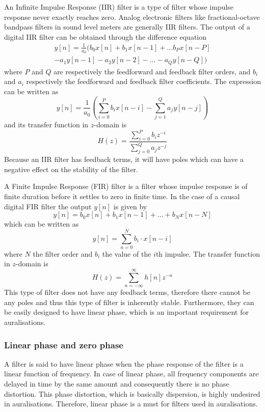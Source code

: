 An Infinite Impulse Response (IIR) filter is a type of filter whose impulse response never exactly reaches zero. Analog electronic filters like fractional-octave bandpass filters in sound level meters are generally IIR filters.
The output of a digital IIR filter can be obtained through the difference equation
\begin{multline}
 y[n] = \frac{1}{a_0} ( b_0 x[n] + b_1 x[n-1] + \dots b_P x[n-P] \\
      - a_1 y[n-1] - a_2 y[n-2] - \dots - a_Q y[n-Q] )
\end{multline}
where $P$ and $Q$ are respectively the feedforward and feedback filter orders, and $b_i$ and $a_i$ respectively the feedforward and feedback filter coefficients.
The expression can be written as
\begin{equation}
 y[n] = \frac{1}{a_0} \left( \sum_{i=0}^{P} b_i x[n-i] - \sum_{j=1}^Q a_j y[n-j] \right)
\end{equation}
and its transfer function in $z$-domain is
\begin{equation}
 H(z) = \frac{\sum_{i=0}^P b_i z^{-i}}{\sum_{j=0}^Q a_j z^{-j}}
\end{equation}
Because an IIR filter has feedback terms, it will have poles which can have a negative effect on the stability of the filter.

A Finite Impulse Response (FIR) filter is a filter whose impulse response is of finite duration before it settles to zero in finite time.
In the case of a causal digital FIR filter the output $y[n]$ is given by
\begin{equation}
 y[n] = b_0 x[n] + b_1 x[n-1] + \dots + b_N x[n-N]
\end{equation}
which can be written as
\begin{equation}
 y[n] = \sum_{n=0}^{N} b_i \cdot x[n-i]
\end{equation}
where $N$ the filter order and $b_i$ the value of the $i$th impulse.
The transfer function in $z$-domain is
\begin{equation}
H(z) = \sum_{n=-\infty}^{\infty} h[n] z^{-n}
\end{equation}
This type of filter does not have any feedback terms, therefore there cannot be any poles and thus this type of filter is inherently stable.
Furthermore, they can be easily designed to have linear phase, which is an important requirement for auralisations.

\subsubsection{Linear phase and zero phase}\label{sec:theory:signal-processing:linear-phase}
A filter is said to have linear phase when the phase response of the filter is a 
linear function of frequency. In case of linear phase, all frequency components 
are delayed in time by the same amount and consequently there is no phase 
distortion. This phase distortion, which is basically dispersion, is highly 
undesired in auralisations. Therefore, linear phase is a must for filters used 
in auralisations.

